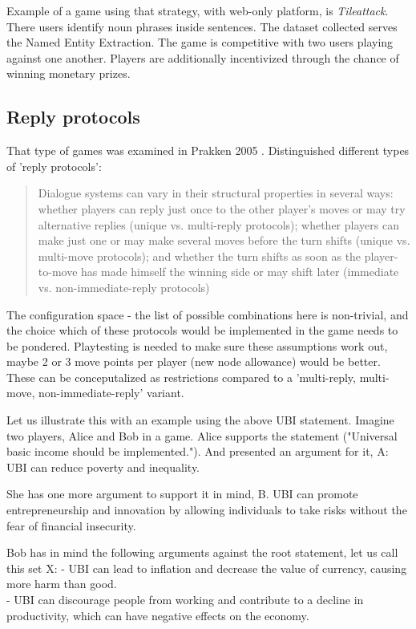 \documentclass{report}
\begin{document}
Example of a game using that strategy, with web-only platform, is  \textit{Tileattack}. There users identify noun phrases inside sentences. The dataset collected serves the Named Entity Extraction. The game is competitive with two users playing against one another. Players are additionally incentivized through the chance of winning monetary prizes.
\cite{noauthor_tileattack_nodate}

\subsection{Reply protocols}
That type of games was examined in Prakken 2005 \cite{prakken_coherence_2005}. Distinguished different types of 'reply protocols':
\begin{quotation}
  Dialogue systems can vary in their structural properties
in several ways: whether players can reply just once to the other player’s moves or may try
alternative replies (unique vs. multi-reply protocols); whether players can make just one or may
make several moves before the turn shifts (unique vs. multi-move protocols); and whether the turn
shifts as soon as the player-to-move has made himself the winning side or may shift later (immediate
vs. non-immediate-reply protocols)
\end{quotation}
\cite[page 1010]{prakken_coherence_2005}

The configuration space - the list of possible combinations here is non-trivial, and the choice which of these protocols would be implemented in the game needs to be pondered.
Playtesting is needed to make sure these assumptions work out, maybe 2 or 3 move points per player (new node allowance) would be better.
These can be conceputalized as restrictions compared to a 'multi-reply, multi-move, non-immediate-reply' variant.

Let us illustrate this with an example using the above UBI statement. Imagine two players, Alice and Bob in a game.
Alice supports the statement ("Universal basic income should be implemented."). And presented an argument for it, A:
UBI can reduce poverty and inequality.

She has one more argument to support it in mind, B.
UBI can promote entrepreneurship and innovation by allowing individuals to take risks without the fear of financial insecurity.

Bob has in mind the following arguments against the root statement, let us call this set X:
- UBI can lead to inflation and decrease the value of currency, causing more harm than good. \\
- UBI can discourage people from working and contribute to a decline in productivity, which can have  negative effects on the economy.\\
\end{document}
